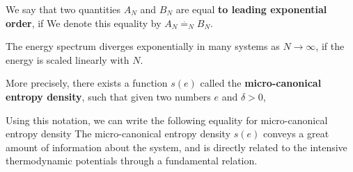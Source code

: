 \documentclass[letterpaper,english,10pt]{article}
\begin{document}
\begin{defn}
We say that two quantities $A_N$ and $B_N$ are equal \textbf{to leading exponential order}, if 
We denote this equality by  $A_N \stackrel{.}{=}_N B_N$. 
\end{defn}
The energy spectrum diverges exponentially in many systems as $N \to \infty$, if the energy is scaled linearly with $N$. 
\begin{defn}
More precisely, there exists a function $s(e)$ called the \textbf{micro-canonical entropy density}, 
such that given two numbers $e$ and $\delta > 0$, 
\end{defn}
Using this notation, we can write the following equality for micro-canonical entropy density
The micro-canonical entropy density $s(e)$ conveys a great amount of information about the system, and is directly related to the intensive thermodynamic potentials through a fundamental relation.
\end{document}
